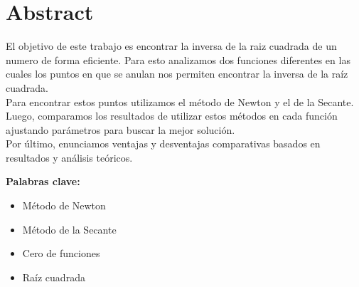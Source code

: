 \section{Abstract}

El objetivo de este trabajo es encontrar la inversa de la raiz cuadrada de un numero de forma eficiente. Para esto analizamos dos funciones diferentes en las cuales los puntos en que se anulan nos permiten encontrar la inversa de la raíz cuadrada.\\

Para encontrar estos puntos utilizamos el método de Newton y el de la Secante. Luego, comparamos los resultados de utilizar estos métodos en cada función ajustando parámetros para buscar la mejor solución.\\

Por último, enunciamos ventajas y desventajas comparativas basados en resultados y análisis teóricos.




{\bf Palabras clave:}
\begin{itemize} 
    \item Método de Newton 
    \item Método de la Secante 
    \item Cero de funciones
    \item Raíz cuadrada
\end{itemize}

